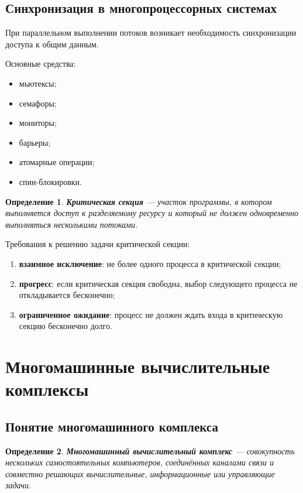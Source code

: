 \documentclass[12pt,a4paper]{article}
\newtheorem{definition}{Определение}
\begin{document}
\subsection{Синхронизация в многопроцессорных системах}

При параллельном выполнении потоков возникает необходимость синхронизации доступа к общим данным.

Основные средства:
\begin{itemize}
    \item мьютексы;
    \item семафоры;
    \item мониторы;
    \item барьеры;
    \item атомарные операции;
    \item спин-блокировки.
\end{itemize}

\begin{definition}
\textbf{Критическая секция} --- участок программы, в котором выполняется доступ к разделяемому ресурсу и который не должен одновременно выполняться несколькими потоками.
\end{definition}

Требования к решению задачи критической секции:
\begin{enumerate}
    \item \textbf{взаимное исключение}: не более одного процесса в критической секции;
    \item \textbf{прогресс}: если критическая секция свободна, выбор следующего процесса не откладывается бесконечно;
    \item \textbf{ограниченное ожидание}: процесс не должен ждать входа в критическую секцию бесконечно долго.
\end{enumerate}

\section{Многомашинные вычислительные комплексы}

\subsection{Понятие многомашинного комплекса}

\begin{definition}
\textbf{Многомашинный вычислительный комплекс} --- совокупность нескольких самостоятельных компьютеров, соединённых каналами связи и совместно решающих вычислительные, информационные или управляющие задачи.
\end{definition}
\end{document}
